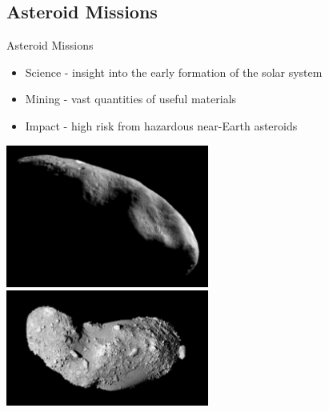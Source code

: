 \subsection[Asteroid Missions]{Asteroid Missions}

\begin{frame}{Asteroid Missions}
\begin{itemize}
    \item Science - insight into the early formation of the solar system
    \item Mining - vast quantities of useful materials
    \item Impact - high risk from hazardous near-Earth asteroids
\end{itemize}    

\begin{center}
    \includegraphics[height=0.38\textheight,width=0.5\textwidth,keepaspectratio]{figures/2016AAS/near_mos_20001203_full.jpg}
    ~
    \includegraphics[height=0.38\textheight,width=0.5\textwidth,keepaspectratio]{figures/2016AAS/Itokawa8_hayabusa_1210.jpg}
\end{center}
\end{frame}

